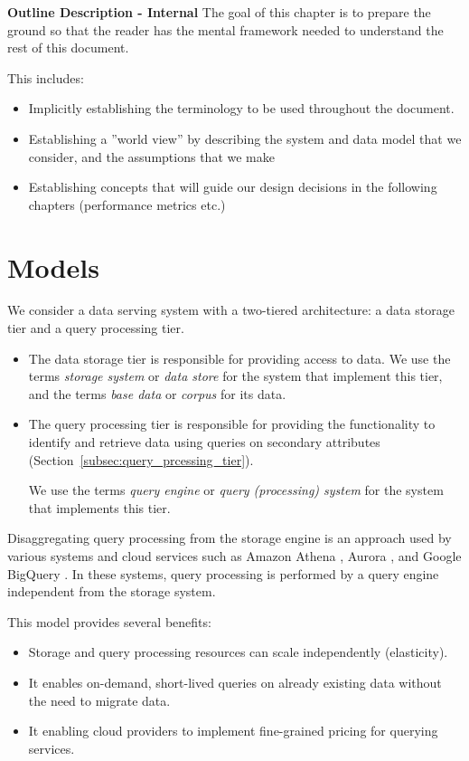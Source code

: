 \begin{tcolorbox}
\textbf{Outline Description - Internal}
The goal of this chapter is to prepare the ground so that the reader has the mental framework needed to understand the
rest of this document.

This includes:
\begin{itemize}
  \item Implicitly establishing the terminology to be used throughout the document.
  \item Establishing a ''world view'' by describing the system and data model that we consider, and the assumptions that
  we make
  \item Establishing concepts that will guide our design decisions in the following chapters (performance metrics etc.)
\end{itemize}
\end{tcolorbox}

\section{Models}
We consider a data serving system with a two-tiered architecture: a data storage tier and a query processing tier.

\begin{itemize}
\item The data storage tier is responsible for providing access to data.
We use the terms \textit{storage system} or \textit{data store} for the system that implement this tier, and the terms
\textit{base data} or \textit{corpus} for its data.
\item The query processing tier is responsible for providing the functionality to identify and retrieve data using
queries on secondary attributes (Section~\ref{subsec:query_prcessing_tier}).

We use the terms \textit{query engine} or \textit{query (processing) system} for the system that implements this tier.
\end{itemize}

Disaggregating query processing from the storage engine is an approach used by various systems and cloud
services such as Amazon Athena \cite{aws:athena}, Aurora \cite{aws:aurora}, and Google BigQuery
\cite{google:bigquery}.
In these systems, query processing is performed by a query engine independent from the storage system.

This model provides several benefits:
\begin{itemize}
  \item Storage and query processing resources can scale independently (elasticity).
  \item It enables on-demand, short-lived queries on already existing data without the need to migrate data.
  \item It enabling cloud providers to implement fine-grained pricing for querying services.
\end{itemize}

